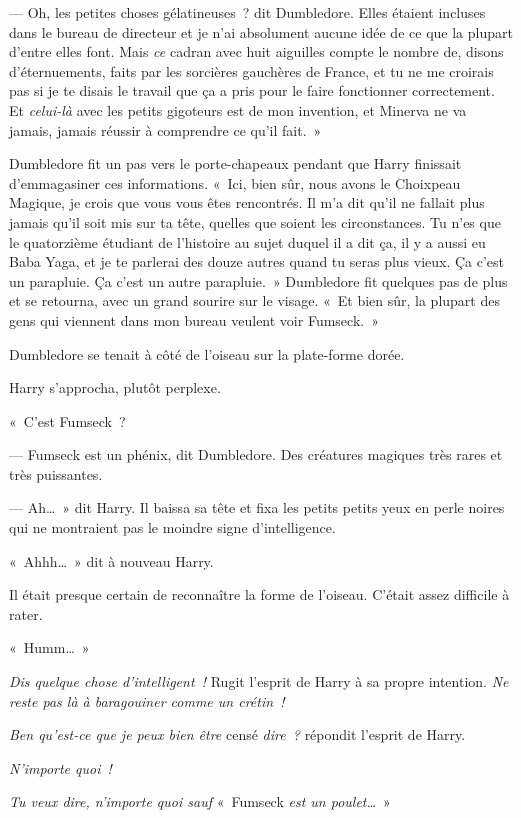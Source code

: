 --- Oh, les petites choses gélatineuses~? dit Dumbledore. Elles étaient incluses dans le bureau de directeur et je n'ai absolument aucune idée de ce que la plupart d'entre elles font. Mais \emph{ce} cadran avec huit aiguilles compte le nombre de, disons d'éternuements, faits par les sorcières gauchères de France, et tu ne me croirais pas si je te disais le travail que ça a pris pour le faire fonctionner correctement. Et \emph{celui-là} avec les petits gigoteurs est de mon invention, et Minerva ne va jamais, jamais réussir à comprendre ce qu'il fait.~»

Dumbledore fit un pas vers le porte-chapeaux pendant que Harry finissait d'emmagasiner ces informations. «~Ici, bien sûr, nous avons le Choixpeau Magique, je crois que vous vous êtes rencontrés. Il m'a dit qu'il ne fallait plus jamais qu'il soit mis sur ta tête, quelles que soient les circonstances. Tu n'es que le quatorzième étudiant de l'histoire au sujet duquel il a dit ça, il y a aussi eu Baba Yaga, et je te parlerai des douze autres quand tu seras plus vieux. Ça c'est un parapluie. Ça c'est un autre parapluie.~» Dumbledore fit quelques pas de plus et se retourna, avec un grand sourire sur le visage. «~Et bien sûr, la plupart des gens qui viennent dans mon bureau veulent voir Fumseck.~»

Dumbledore se tenait à côté de l'oiseau sur la plate-forme dorée.

Harry s'approcha, plutôt perplexe.

«~C'est Fumseck~?

--- Fumseck est un phénix, dit Dumbledore. Des créatures magiques très rares et très puissantes.

--- Ah…~» dit Harry. Il baissa sa tête et fixa les petits petits yeux en perle noires qui ne montraient pas le moindre signe d'intelligence.

«~Ahhh…~» dit à nouveau Harry.

Il était presque certain de reconnaître la forme de l'oiseau. C'était assez difficile à rater.

«~Humm…~»

\emph{Dis quelque chose d'intelligent~!} Rugit l'esprit de Harry à sa propre intention. \emph{Ne reste pas là à baragouiner comme un crétin~!}

\emph{Ben qu'est-ce que je peux bien être} censé \emph{dire~?} répondit l'esprit de Harry.

\emph{N'importe quoi~!}

\emph{Tu veux dire, n'importe quoi sauf} «~Fumseck \emph{est un poulet…}~»

